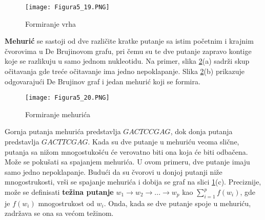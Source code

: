 \documentclass[12pt,oneside]{memoir}
\begin{document}
\begin{figure}[!ht]
\centering
\texttt{[image: Figura5\_19.PNG]}
\caption{Formiranje vrha \cite{WingKinSung}}
\label{fig:13}
\end{figure}


\textbf{Mehurić} se sastoji od dve različite kratke putanje sa istim početnim i
krajnim čvorovima u De Brujinovom grafu, pri čemu su te dve putanje zapravo kontige koje se razlikuju u samo jednom nukleotidu. Na primer, slika \ref{fig:133}(a) sadrži skup očitavanja gde treće očitavanje ima jedno nepoklapanje. Slika \ref{fig:133}(b) prikazuje odgovarajući De Brujinov graf i jedan mehurić koji se formira.

\begin{figure}[!ht]
\centering
\texttt{[image: Figura5\_20.PNG]}
\caption{Formiranje mehurića \cite{WingKinSung}}
\label{fig:133}
\end{figure}

\noindent Gornja putanja mehurića predstavlja $GACTCCGAG$, dok donja putanja predstavlja $GACTTCGAG$. Kada su dve putanje u mehuriću veoma slične, putanja sa nižom mnogostukošću će verovatno biti ona koja će biti odbačena. Može se pokušati sa spajanjem mehurića. U ovom primeru, dve putanje imaju samo jedno nepoklapanje. Budući da su čvorovi u donjoj putanji niže mnogostrukosti, vrši se spajanje mehurića i dobija se graf na slici \ref{fig:13}(c). Preciznije, može se definisati \textbf{težina putanje} $w_1 \rightarrow w_2 \rightarrow ... \rightarrow w_p$ kao $\sum_{i=1}^{p} f(w_i)$, gde je $f(w_i)$ mnogostrukost od $w_i$. Onda, kada se dve putanje spoje u mehuriću, zadržava se ona sa većom težinom.
\begin{comment}
Za spajanje mehurića, može se koristiti \textbf{algoritam turneje} (engl. \textit{tourbus algorithm}) koji će biti detaljno objašnjen u poglavlju \ref{odeljak:Tourbus}.
\end{comment}
\end{document}
